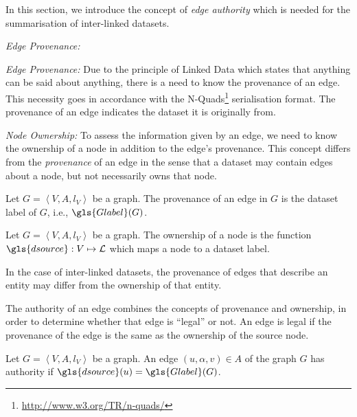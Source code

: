 In this section, we introduce the concept of \emph{edge authority} which is needed for the summarisation of inter-linked datasets.

\begin{labeling}{\emph{Edge Provenance:}}
	\item[\emph{Edge Provenance:}] Due to the principle of Linked Data which states that anything can be said about anything, there is a need to know the provenance of an edge. This necessity goes in accordance with the N-Quads\footnote{\url{http://www.w3.org/TR/n-quads/}} serialisation format. The provenance of an edge indicates the dataset it is originally from.
	
	\item[\emph{Node Ownership:}] To assess the information given by an edge, we need to know the ownership of a node in addition to the edge's provenance. This concept differs from the \emph{provenance} of an edge in the sense that a dataset may contain edges about a node, but not necessarily owns that node.
\end{labeling}

\begin{definition}
	Let $G = \left\langle V, A, l_V \right\rangle$ be a graph. The provenance of an edge in $G$ is the dataset label of $G$, i.e., $\gls{Glabel}(G)$.
\end{definition}

\begin{definition}
	Let $G = \left\langle V, A, l_V \right\rangle$ be a graph. The ownership of a node is the function $\gls{dsource} : V \mapsto \mathcal{L}$ which maps a node to a dataset label.
\end{definition}

\begin{remark}
	In the case of inter-linked datasets, the provenance of edges that describe an entity may differ from the ownership of that entity.
\end{remark}

The authority of an edge combines the concepts of provenance and ownership, in order to determine whether that edge is ``legal'' or not. An edge is legal if the provenance of the edge is the same as the ownership of the source node.

\begin{definition}
	Let $G = \left\langle V, A, l_V \right\rangle$ be a graph.
	An edge $(u, \alpha, v) \in A$ of the graph $G$ has authority if $\gls{dsource}(u) = \gls{Glabel}(G)$.
\end{definition}

